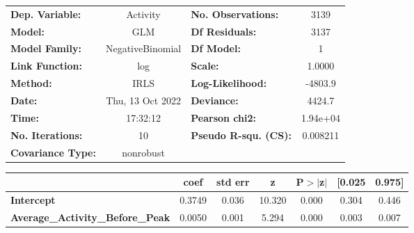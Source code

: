 \begin{center}
\begin{tabular}{lclc}
\toprule
\textbf{Dep. Variable:}                  &     Activity     & \textbf{  No. Observations:  } &     3139    \\
\textbf{Model:}                          &       GLM        & \textbf{  Df Residuals:      } &     3137    \\
\textbf{Model Family:}                   & NegativeBinomial & \textbf{  Df Model:          } &        1    \\
\textbf{Link Function:}                  &       log        & \textbf{  Scale:             } &    1.0000   \\
\textbf{Method:}                         &       IRLS       & \textbf{  Log-Likelihood:    } &   -4803.9   \\
\textbf{Date:}                           & Thu, 13 Oct 2022 & \textbf{  Deviance:          } &    4424.7   \\
\textbf{Time:}                           &     17:32:12     & \textbf{  Pearson chi2:      } &  1.94e+04   \\
\textbf{No. Iterations:}                 &        10        & \textbf{  Pseudo R-squ. (CS):} &  0.008211   \\
\textbf{Covariance Type:}                &    nonrobust     & \textbf{                     } &             \\
\bottomrule
\end{tabular}
\begin{tabular}{lcccccc}
                                         & \textbf{coef} & \textbf{std err} & \textbf{z} & \textbf{P$> |$z$|$} & \textbf{[0.025} & \textbf{0.975]}  \\
\midrule
\textbf{Intercept}                       &       0.3749  &        0.036     &    10.320  &         0.000        &        0.304    &        0.446     \\
\textbf{Average\_Activity\_Before\_Peak} &       0.0050  &        0.001     &     5.294  &         0.000        &        0.003    &        0.007     \\
\bottomrule
\end{tabular}
\end{center}